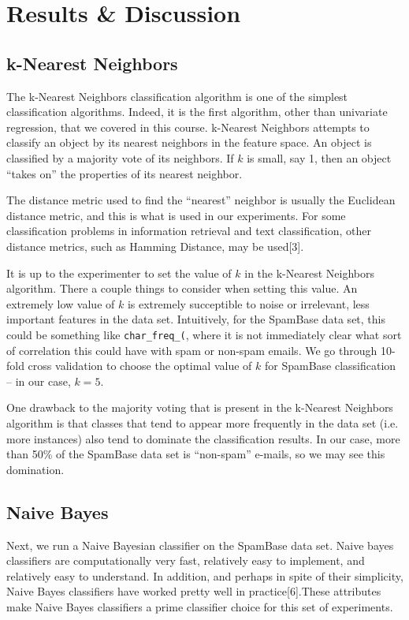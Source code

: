 \documentclass[a4paper,10pt]{article}
\begin{document}
\section{Results \& Discussion}

\subsection{k-Nearest Neighbors}

The k-Nearest Neighbors classification algorithm is one of the simplest classification algorithms. Indeed, it is the first algorithm,
other than univariate regression, that we covered in this course. k-Nearest Neighbors attempts to classify an object by its nearest
neighbors in the feature space. An object is classified by a majority vote of its neighbors. If $k$ is small, say 1, then an object
``takes on'' the properties of its nearest neighbor. 

The distance metric used to find the ``nearest'' neighbor is usually the Euclidean distance metric, and this is what is used in our
experiments. For some classification problems in information retrieval and text classification, other distance metrics, such as
Hamming Distance, may be used[3].

It is up to the experimenter to set the value of $k$ in the k-Nearest Neighbors algorithm. There a couple things to consider when
setting this value. An extremely low value of $k$ is extremely succeptible to noise or irrelevant, less important features in the
data set. Intuitively, for the SpamBase data set, this could be something like \texttt{char\_freq\_(}, where it is not immediately clear
what sort of correlation this could have with spam or non-spam emails. We go through 10-fold cross validation to choose the optimal
value of $k$ for SpamBase classification -- in our case, $k=5$.

One drawback to the majority voting that is present in the k-Nearest Neighbors algorithm is that classes that tend to appear more
frequently in the data set (i.e. more instances) also tend to dominate the classification results. In our case, more than 50\% of the
SpamBase data set is ``non-spam'' e-mails, so we may see this domination.


\subsection{Naive Bayes}

Next, we run a Naive Bayesian classifier on the SpamBase data set. Naive bayes classifiers are computationally very fast, relatively
easy to implement, and relatively easy to understand. In addition, and perhaps in spite of their simplicity, Naive Bayes classifiers have
worked pretty well in practice[6].These attributes make Naive Bayes classifiers a prime classifier choice for this 
set of experiments.
\end{document}
